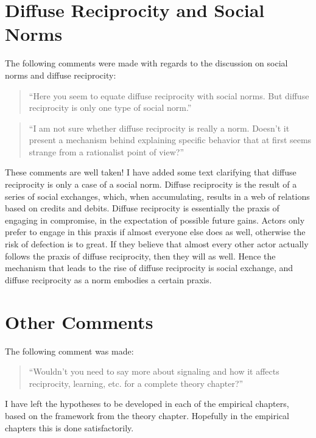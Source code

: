 \documentclass{article}
\begin{document}
\section{Diffuse Reciprocity and Social Norms}

The following comments were made with regards to the discussion on social norms and diffuse reciprocity:

\begin{quote}
  ``Here you seem to equate diffuse reciprocity with social norms. But diffuse reciprocity is only one type of social norm.''
\end{quote}

\begin{quote}
  ``I am not sure whether diffuse reciprocity is really a norm. Doesn't it present a mechanism behind explaining specific behavior that at first seems strange from a rationalist point of view?''
\end{quote}

These comments are well taken! I have added some text clarifying that diffuse reciprocity is only a case of a social norm. Diffuse reciprocity is the result of a series of social exchanges, which, when accumulating, results in a web of relations based on credits and debits. Diffuse reciprocity is essentially the praxis of engaging in compromise, in the expectation of possible future gains. Actors only prefer to engage in this praxis if almost everyone else does as well, otherwise the risk of defection is to great. If they believe that almost every other actor actually follows the praxis of diffuse reciprocity, then they will as well. Hence the mechanism that leads to the rise of diffuse reciprocity is social exchange, and diffuse reciprocity as a norm embodies a certain praxis. 

\section{Other Comments}

The following comment was made:

\begin{quote}
  ``Wouldn't you need to say more about signaling and how it affects reciprocity, learning, etc. for a complete theory chapter?''
\end{quote}

I have left the hypotheses to be developed in each of the empirical chapters, based on the framework from the theory chapter. Hopefully in the empirical chapters this is done satisfactorily. 



 



\end{document}
